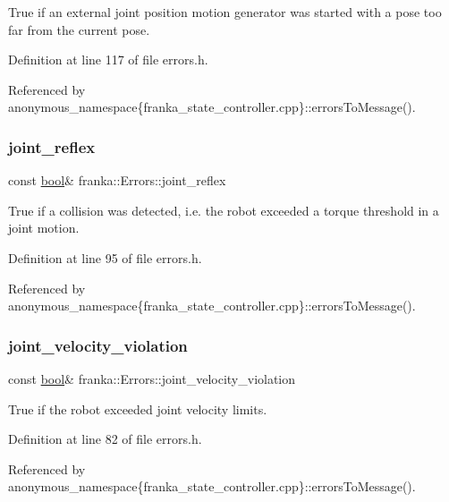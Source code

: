 True if an external joint position motion generator was started with a pose too far from the current pose. 

Definition at line 117 of file errors.\+h.



Referenced by anonymous\+\_\+namespace\{franka\+\_\+state\+\_\+controller.\+cpp\}\+::errors\+To\+Message().

\mbox{\label{structfranka_1_1Errors_afb0928680c586e73d4e2cd4b42c7fe48}} 
\subsubsection{\texorpdfstring{joint\+\_\+reflex}{joint\_reflex}}
{\footnotesize\ttfamily const \hyperlink{classbool}{bool}\& franka\+::\+Errors\+::joint\+\_\+reflex}

True if a collision was detected, i.\+e. the robot exceeded a torque threshold in a joint motion. 

Definition at line 95 of file errors.\+h.



Referenced by anonymous\+\_\+namespace\{franka\+\_\+state\+\_\+controller.\+cpp\}\+::errors\+To\+Message().

\mbox{\label{structfranka_1_1Errors_a803ac4acbc26350602ea2eb02b7b30c4}} 
\subsubsection{\texorpdfstring{joint\+\_\+velocity\+\_\+violation}{joint\_velocity\_violation}}
{\footnotesize\ttfamily const \hyperlink{classbool}{bool}\& franka\+::\+Errors\+::joint\+\_\+velocity\+\_\+violation}

True if the robot exceeded joint velocity limits. 

Definition at line 82 of file errors.\+h.



Referenced by anonymous\+\_\+namespace\{franka\+\_\+state\+\_\+controller.\+cpp\}\+::errors\+To\+Message().

